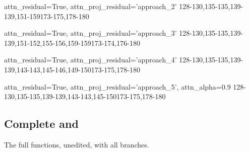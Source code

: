 {attn\_residual=True, attn\_proj\_residual='approach\_2'}
{128-130,135-135,139-139,151-159}{173-175,178-180}

{attn\_residual=True, attn\_proj\_residual='approach\_3'}
{128-130,135-135,139-139,151-152,155-156,159-159}{173-174,176-180}

{attn\_residual=True, attn\_proj\_residual='approach\_4'}
{128-130,135-135,139-139,143-143,145-146,149-150}{173-175,178-180}

{attn\_residual=True, attn\_proj\_residual='approach\_5', attn\_alpha=0.9}
{128-130,135-135,139-139,143-143,145-150}{173-175,178-180}

\subsection{Complete  and }\label{app:full}
The full functions, unedited, with all branches.

